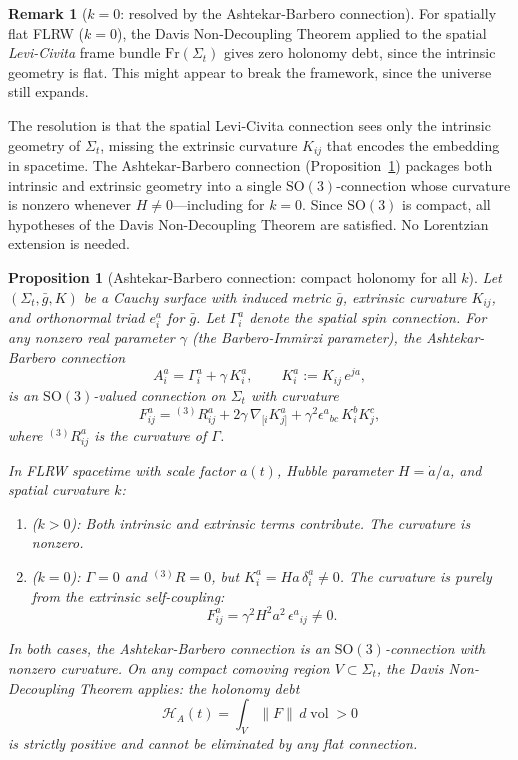 \documentclass[12pt]{amsart}
\newtheorem{proposition}[theorem]{Proposition}
\theoremstyle{definition}
\newtheorem{remark}[theorem]{Remark}
\newcommand{\vol}{\operatorname{vol}}
\begin{document}
\begin{remark}[$k = 0$: resolved by the Ashtekar-Barbero connection]
\label{rmk:kzero}
For spatially flat FLRW ($k = 0$), the Davis Non-Decoupling Theorem applied to the spatial \emph{Levi-Civita} frame bundle $\mathrm{Fr}(\Sigma_t)$ gives zero holonomy debt, since the intrinsic geometry is flat.  This might appear to break the framework, since the universe still expands.

The resolution is that the spatial Levi-Civita connection sees only the intrinsic geometry of $\Sigma_t$, missing the extrinsic curvature $K_{ij}$ that encodes the embedding in spacetime.  The Ashtekar-Barbero connection (Proposition~\ref{prop:ashtekar}) packages both intrinsic and extrinsic geometry into a single $\mathrm{SO}(3)$-connection whose curvature is nonzero whenever $H \neq 0$---including for $k = 0$.  Since $\mathrm{SO}(3)$ is compact, all hypotheses of the Davis Non-Decoupling Theorem are satisfied.  No Lorentzian extension is needed.
\end{remark}

\begin{proposition}[Ashtekar-Barbero connection: compact holonomy for all $k$]
\label{prop:ashtekar}
Let $(\Sigma_t, \bar{g}, K)$ be a Cauchy surface with induced metric $\bar{g}$, extrinsic curvature $K_{ij}$, and orthonormal triad $e^a_i$ for $\bar{g}$.  Let $\Gamma^a_i$ denote the spatial spin connection.  For any nonzero real parameter $\gamma$ (the Barbero-Immirzi parameter), the \emph{Ashtekar-Barbero connection}
\[
A^a_i = \Gamma^a_i + \gamma\, K^a_i, \qquad K^a_i := K_{ij}\,e^{ja},
\]
is an $\mathrm{SO}(3)$-valued connection on $\Sigma_t$ with curvature
\[
F^a_{ij} = {}^{(3)}\!R^a_{ij} + 2\gamma\,\nabla_{[i}K^a_{j]} + \gamma^2 \epsilon^a{}_{bc}\,K^b_i K^c_j,
\]
where ${}^{(3)}\!R^a_{ij}$ is the curvature of $\Gamma$.

In FLRW spacetime with scale factor $a(t)$, Hubble parameter $H = \dot{a}/a$, and spatial curvature $k$:
\begin{enumerate}[label=\textup{(\alph*)}]
\item \textup{($k > 0$):} Both intrinsic and extrinsic terms contribute.  The curvature is nonzero.
\item \textup{($k = 0$):} $\Gamma = 0$ and ${}^{(3)}\!R = 0$, but $K^a_i = Ha\,\delta^a_i \neq 0$.  The curvature is purely from the extrinsic self-coupling:
\begin{equation}
\label{eq:ashtekar-k0}
F^a_{ij} = \gamma^2 H^2 a^2\,\epsilon^a{}_{ij} \neq 0.
\end{equation}
\end{enumerate}
In both cases, the Ashtekar-Barbero connection is an $\mathrm{SO}(3)$-connection with nonzero curvature.  On any compact comoving region $V \subset \Sigma_t$, the Davis Non-Decoupling Theorem applies: the holonomy debt
\[
\mathcal{H}_A(t) = \int_V \|F\|\,d\vol > 0
\]
is strictly positive and cannot be eliminated by any flat connection.
\end{proposition}
\end{document}
